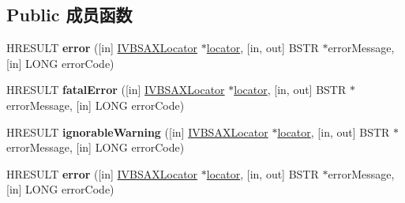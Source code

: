 \subsection*{Public 成员函数}
\begin{DoxyCompactItemize}
\item 
\mbox{\label{interface_m_s_x_m_l2_1_1_i_v_b_s_a_x_error_handler_a75484ed42710e63492381debbc3aa62a}} 
H\+R\+E\+S\+U\+LT {\bfseries error} (\mbox{[}in\mbox{]} \hyperlink{interface_m_s_x_m_l2_1_1_i_v_b_s_a_x_locator}{I\+V\+B\+S\+A\+X\+Locator} $\ast$\hyperlink{structlocator}{locator}, \mbox{[}in, out\mbox{]} B\+S\+TR $\ast$error\+Message, \mbox{[}in\mbox{]} L\+O\+NG error\+Code)
\item 
\mbox{\label{interface_m_s_x_m_l2_1_1_i_v_b_s_a_x_error_handler_a6bda3206f210ca18f622c75eecf885bc}} 
H\+R\+E\+S\+U\+LT {\bfseries fatal\+Error} (\mbox{[}in\mbox{]} \hyperlink{interface_m_s_x_m_l2_1_1_i_v_b_s_a_x_locator}{I\+V\+B\+S\+A\+X\+Locator} $\ast$\hyperlink{structlocator}{locator}, \mbox{[}in, out\mbox{]} B\+S\+TR $\ast$error\+Message, \mbox{[}in\mbox{]} L\+O\+NG error\+Code)
\item 
\mbox{\label{interface_m_s_x_m_l2_1_1_i_v_b_s_a_x_error_handler_ae59932ade52d66064600d6202218f681}} 
H\+R\+E\+S\+U\+LT {\bfseries ignorable\+Warning} (\mbox{[}in\mbox{]} \hyperlink{interface_m_s_x_m_l2_1_1_i_v_b_s_a_x_locator}{I\+V\+B\+S\+A\+X\+Locator} $\ast$\hyperlink{structlocator}{locator}, \mbox{[}in, out\mbox{]} B\+S\+TR $\ast$error\+Message, \mbox{[}in\mbox{]} L\+O\+NG error\+Code)
\item 
\mbox{\label{interface_m_s_x_m_l2_1_1_i_v_b_s_a_x_error_handler_a75484ed42710e63492381debbc3aa62a}} 
H\+R\+E\+S\+U\+LT {\bfseries error} (\mbox{[}in\mbox{]} \hyperlink{interface_m_s_x_m_l2_1_1_i_v_b_s_a_x_locator}{I\+V\+B\+S\+A\+X\+Locator} $\ast$\hyperlink{structlocator}{locator}, \mbox{[}in, out\mbox{]} B\+S\+TR $\ast$error\+Message, \mbox{[}in\mbox{]} L\+O\+NG error\+Code)
\item 
\mbox{\label{interface_m_s_x_m_l2_1_1_i_v_b_s_a_x_error_handler_a6bda3206f210ca18f622c75eecf885bc}} 

\end{DoxyCompactItemize}
